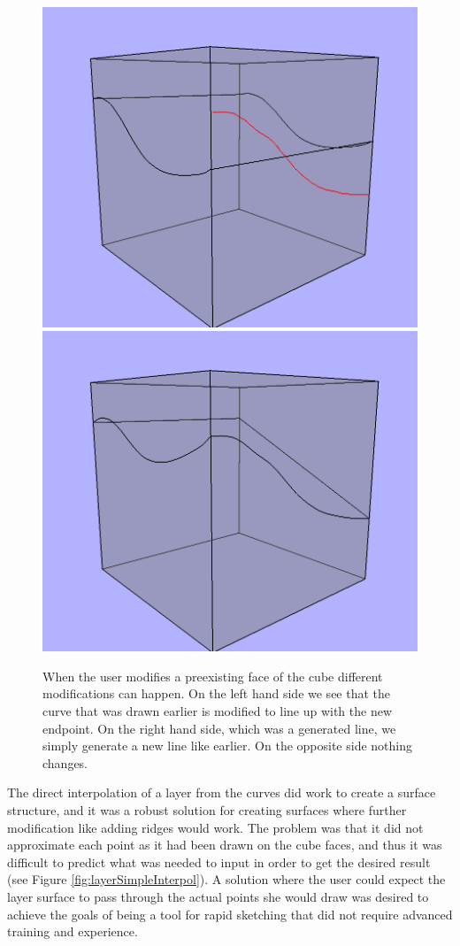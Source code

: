 \documentclass[a4paper,12pt]{report}
\begin{document}
\begin{figure}
\includegraphics[width=.5\linewidth]{thesis/modification1.png}
\includegraphics[width=.5\linewidth]{thesis/modification2.png}
 \caption{When the user modifies a preexisting face of the cube different modifications can happen. On the left hand side we see that the curve that was drawn earlier is modified to line up with the new endpoint. On the right hand side, which was a generated line, we simply generate a new line like earlier. On the opposite side nothing changes.}
 \label{fig:layerModify}
\end{figure}


The direct interpolation of a layer from the curves did work to create a surface structure, and it was a robust solution for creating surfaces where further modification like adding ridges would work. The problem was that it did not approximate each point as it had been drawn on the cube faces, and thus it was difficult to predict what was needed to input in order to get the desired result (see Figure \ref{fig:layerSimpleInterpol}). A solution where the user could expect the layer surface to pass through the actual points she would draw was desired to achieve the goals of being a tool for rapid sketching that did not require advanced training and experience.
\end{document}
